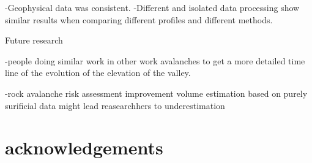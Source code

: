 \documentclass[5p]{elsarticle}
\begin{document}
-Geophysical data was consistent.
	-Different and isolated data processing show similar results when comparing different profiles and different methods. 


Future research 


-people doing similar work in other work avalanches to get a more detailed time line of the evolution of the elevation of the valley.  


-rock avalanche risk assessment improvement 
	volume estimation based on purely surificial data might lead reasearchhers to underestimation


\section{acknowledgements}







\end{document}
